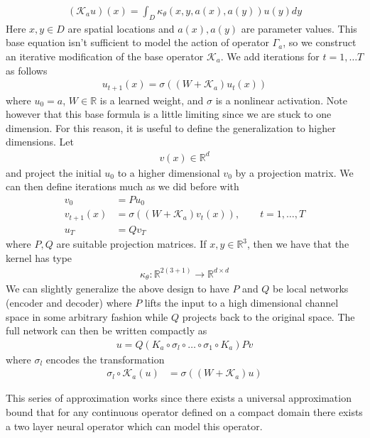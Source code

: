\documentclass[book.tex]{subfiles}
\begin{document}
\begin{align}
    (\mathcal{K}_a u)(x) = \int_D \kappa_\theta(x, y, a(x), a(y)) u(y) dy
\end{align}
Here $x, y \in D$ are spatial locations and $a(x), a(y)$ are parameter values. This base equation isn't sufficient to model the action of operator $\Gamma_a$, so we construct an iterative modification of the base operator $\mathcal{K}_a$. We add iterations for $t=1,\dotsc T$ as follows
\begin{align}
u_{t+1}(x) = \sigma \left ((W  + \mathcal{K}_a)u_t(x) \right )
\end{align}
where $u_0 = a$, $W \in \mathbb{R}$ is a learned weight, and $\sigma$ is a nonlinear activation. Note however that this base formula is a little limiting since we are stuck to one dimension. For this reason, it is useful to define the generalization to higher dimensions. Let
\begin{align}
v(x) \in \mathbb{R}^d
\end{align}
and project the initial $u_0$ to a higher dimensional $v_0$ by a projection matrix. We can then define iterations much as we did before with
\begin{align}
v_0 &= P u_0 \\
v_{t+1}(x) &= \sigma \left ((W  + \mathcal{K}_a)v_t(x) \right ), \qquad t = 1,\dotsc,T\\
u_{T} &= Q v_T
\end{align}
where $P, Q$ are suitable projection matrices. If $x, y \in \mathbb{R}^3$, then we have that the kernel has type
\begin{align}
\kappa_\theta: \mathbb{R}^{2(3+1)} \to \mathbb{R}^{d \times d}
\end{align}
We can slightly generalize the above design to have $P$ and $Q$ be local networks (encoder and decoder) where $P$ lifts the input to a high dimensional channel space in some arbitrary fashion while $Q$ projects back to the original space. The full network can then be written compactly as 
\begin{align}
u = Q(K_a \circ \sigma_l \circ \dotsc \circ \sigma_1 \circ K_a)P v
\end{align}
where $\sigma_l$ encodes the transformation
\begin{align}
\sigma_l \circ \mathcal{K}_a (u) &= \sigma((W + \mathcal{K}_a) u)
\end{align}

This series of approximation works since there exists a universal approximation bound that for any continuous operator defined on a compact domain there exists a two layer neural operator which can model this operator. %
\end{document}
